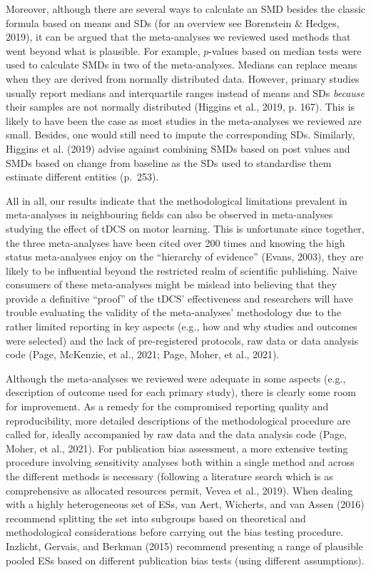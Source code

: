\documentclass[
  man,floatsintext]{apa6}
\begin{document}
Moreover, although there are several ways to calculate an SMD besides the classic formula based on means and SDs (for an overview see Borenstein \& Hedges, 2019), it can be argued that the meta-analyses we reviewed used methods that went beyond what is plausible. For example, \(p\)-values based on median tests were used to calculate SMDs in two of the meta-analyses. Medians can replace means when they are derived from normally distributed data. However, primary studies usually report medians and interquartile ranges instead of means and SDs \emph{because} their samples are not normally distributed (Higgins et al., 2019, p. 167). This is likely to have been the case as most studies in the meta-analyses we reviewed are small. Besides, one would still need to impute the corresponding SDs. Similarly, Higgins et al. (2019) advise against combining SMDs based on post values and SMDs based on change from baseline as the SDs used to standardise them estimate different entities (p.~253).

All in all, our results indicate that the methodological limitations prevalent in meta-analyses in neighbouring fields can also be observed in meta-analyses studying the effect of tDCS on motor learning. This is unfortunate since together, the three meta-analyses have been cited over 200 times and knowing the high status meta-analyses enjoy on the ``hierarchy of evidence'' (Evans, 2003), they are likely to be influential beyond the restricted realm of scientific publishing. Naive consumers of these meta-analyses might be mislead into believing that they provide a definitive ``proof'' of the tDCS' effectiveness and researchers will have trouble evaluating the validity of the meta-analyses' methodology due to the rather limited reporting in key aspects (e.g., how and why studies and outcomes were selected) and the lack of pre-registered protocols, raw data or data analysis code (Page, McKenzie, et al., 2021; Page, Moher, et al., 2021).

Although the meta-analyses we reviewed were adequate in some aspects (e.g., description of outcome used for each primary study), there is clearly some room for improvement. As a remedy for the compromised reporting quality and reproducibility, more detailed descriptions of the methodological procedure are called for, ideally accompanied by raw data and the data analysis code (Page, Moher, et al., 2021). For publication bias assessment, a more extensive testing procedure involving sensitivity analyses both within a single method and across the different methods is necessary (following a literature search which is as comprehensive as allocated resources permit, Vevea et al., 2019). When dealing with a highly heterogeneous set of ESs, van Aert, Wicherts, and van Assen (2016) recommend splitting the set into subgroups based on theoretical and methodological considerations before carrying out the bias testing procedure. Inzlicht, Gervais, and Berkman (2015) recommend presenting a range of plausible pooled ESs based on different publication bias tests (using different assumptions).
\end{document}
